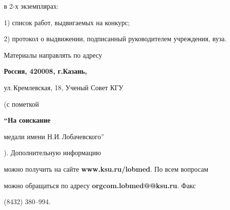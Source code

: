 в 2-х экземплярах:





1) список работ, выдвигаемых на конкурс;





2) протокол о выдвижении, подписанный руководителем учреждения, вуза.





Материалы направлять по адресу {\bf Россия, 420008, г.Казань,


ул.\,Крем\-лев\-ская, 18, Ученый Совет КГУ} (с пометкой {\bf ``На соискание


медали имени Н.И.\,Лобачевского''}). Дополнительную информацию


можно получить на сайте {\bf www.ksu.ru/lobmed}. По всем вопросам


можно обращаться по адресу {\bf orgcom.lobmed@@ksu.ru}. Факс


(8432) 380--994.











